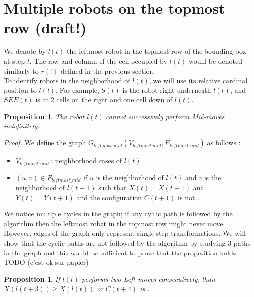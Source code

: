 \documentclass[11pt, a4paper]{article}
\theoremstyle{plain}
\newtheorem{prop}[thm]{Proposition}
\theoremstyle{definition}
\theoremstyle{remark}
\begin{document}
\section{Multiple robots on the topmost row (draft!)}

We denote by $l(t)$ the leftmost robot in the topmost row of the bounding box at
step $t$. The row and column of the cell occupied by $l(t)$ would be denoted
similarly to $r(t)$ defined in the previous section. \\

To identify robots in the neighborhood of $l(t)$, we will use its relative
cardinal position to $l(t)$. For example, $S(t)$ is the robot right underneath
$l(t)$, and $SEE(t)$ is at 2 cells on the right and one cell down of $l(t)$.

\begin{prop}
The robot $l(t)$ cannot successively perform \emph{Mid-move}s indefinitely.
\end{prop}

\begin{proof}

We define the graph $G_{leftmost\_mid}(V_{leftmost\_mid},
E_{leftmost\_mid})$ as follows :
\begin{itemize}
  \item $V_{leftmost\_mid}$ : neighborhood cases of $l(t)$.
  \item $(u,v) \in E_{leftmost\_mid}$ if $u$ is the neighborhood of $l(t)$ and
        $v$ is the neighborhood of $l(t+1)$ such that $X(t)=X(t+1)$ and
        $Y(t)=Y(t+1)$ and the configuration $C(t+1)$ is not \Gathered.
\end{itemize}
We notice multiple cycles in the graph; if any cyclic path is followed by the
algorithm then the leftmost robot in the topmost row might never move. However,
edges of the
graph only represent single step transformations. We will show that the cyclic
paths are not followed by the algorithm by studying 3 paths in the graph and
this would be sufficient to prove that the proposition holds. \\

TODO (c'est ok sur papier)

\end{proof}

\begin{prop}
If $l(t)$ performs two \emph{Left-move}s consecutively, than $X(l(t+3)) \geq
X(l(t))$ or $C(t+4)$ is \Gathered.
\end{prop}
\end{document}
